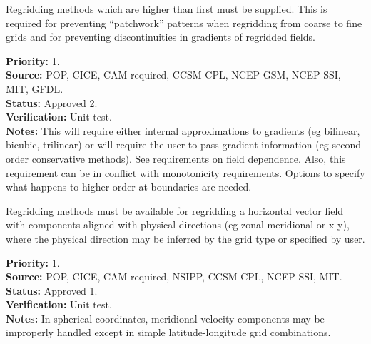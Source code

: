 
Regridding methods which are higher than first 
must be supplied.  This is required for preventing
``patchwork'' patterns when regridding from coarse to fine
grids and for preventing discontinuities in gradients of
regridded fields.

\begin{reqlist}
{\bf Priority:} 1. \\
{\bf Source:}  POP, CICE, CAM required, CCSM-CPL, NCEP-GSM, NCEP-SSI, MIT, GFDL. \\
{\bf Status:} Approved 2. \\
{\bf Verification:} Unit test. \\
{\bf Notes:} This will require either internal approximations to
             gradients (eg bilinear, bicubic, trilinear) or will require the
             user to pass gradient information (eg second-order conservative
             methods).  See requirements on field dependence.  Also, this
             requirement can be in conflict with monotonicity requirements.
             Options to specify what happens to higher-order at
             boundaries are needed.
\end{reqlist}


Regridding methods must be available for regridding a horizontal
vector field with components aligned with physical directions
(eg zonal-meridional or x-y), where the physical direction may be
inferred by the grid type or specified by user.

\begin{reqlist}
{\bf Priority:} 1. \\
{\bf Source:}  POP, CICE, CAM required, NSIPP, CCSM-CPL, NCEP-SSI, MIT. \\
{\bf Status:} Approved 1. \\
{\bf Verification:} Unit test. \\
{\bf Notes:} In spherical coordinates, meridional velocity components
             may be improperly handled except in simple latitude-longitude
             grid combinations.
\end{reqlist}


